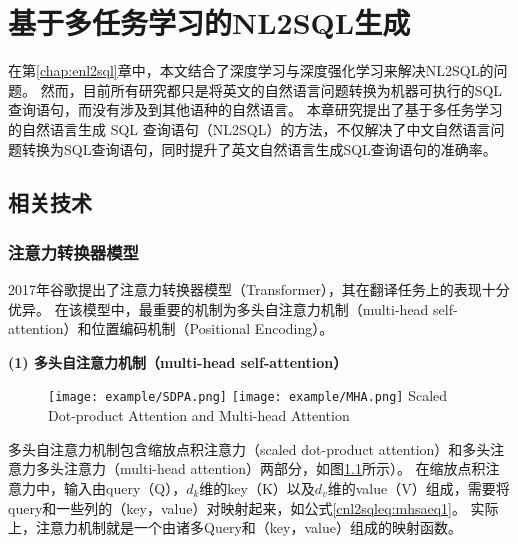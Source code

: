 
\chapter{基于多任务学习的NL2SQL生成}
\label{chap:cnl2sql}
在第\ref{chap:enl2sql}章中，本文结合了深度学习与深度强化学习来解决NL2SQL的问题。
然而，目前所有研究都只是将英文的自然语言问题转换为机器可执行的SQL查询语句，而没有涉及到其他语种的自然语言。
本章研究提出了基于多任务学习的自然语言生成 SQL 查询语句（NL2SQL）的方法，不仅解决了中文自然语言问题转换为SQL查询语句，同时提升了英文自然语言生成SQL查询语句的准确率。


\section{相关技术}
\subsection{注意力转换器模型}

2017年谷歌提出了注意力转换器模型（Transformer）\cite{vaswani2017attention}，其在翻译任务上的表现十分优异。
在该模型中，最重要的机制为多头自注意力机制（multi-head self-attention）和位置编码机制（Positional Encoding）。

\textbf{(1) 多头自注意力机制（multi-head self-attention）}

\begin{figure}[!htp]
  \centering
  \texttt{[image: example/SDPA.png]}
  \texttt{[image: example/MHA.png]}
    {Scaled Dot-product Attention and Multi-head Attention}
  \label{fig:SDPAMHA}
\end{figure}

多头自注意力机制包含缩放点积注意力（scaled dot-product attention）和多头注意力多头注意力（multi-head attention）两部分，如图\ref{fig:SDPAMHA}所示）。
在缩放点积注意力中，输入由query（Q），$d_k$维的key（K）以及$d_v$维的value（V）组成，需要将query和一些列的（key，value）对映射起来，如公式\ref{cnl2sqleq:mhsaeq1}。
实际上，注意力机制就是一个由诸多Query和（key，value）组成的映射函数。

